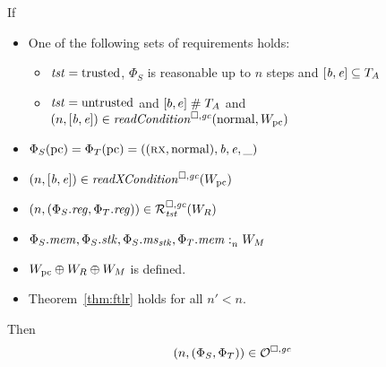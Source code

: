 \begin{lemma}
  \label{lem:ftlr-internal-lemma}
  If
  \begin{itemize}
  \item One of the following sets of requirements holds:
    \begin{itemize}
    \item $\mathit{tst} = \mathrm{trusted}$, $\Phi_S$ is reasonable up to $n$ steps and $[\mathit{b},\mathit{e}] \subseteq T_{A}$
    \item $\mathit{tst} = \mathrm{untrusted}$ and $[b,e] \mathrel{\#} T_{A}$ and $\npair{[\baddr,\eaddr]} \in \readCond{\normal,W_\pcreg}$
    \end{itemize}
  \item $\Phi_S(\mathrm{pc}) = \Phi_T(\mathrm{pc}) = ((\textsc{rx},\mathrm{normal}),\mathit{b},\mathit{e},\_)$
  \item $\npair{[\baddr,\eaddr]} \in \xReadCond{W_\pcreg}$
  \item $\npair{(\Phi_S.\reg,\Phi_T.\reg)} \in \lrrg{\trust}(W_R)$
  \item $\Phi_S.\mathit{mem},\Phi_S.\mathit{stk},\Phi_S.\mathit{ms}_{\mathit{stk}},\Phi_T.\mathit{mem} :_{n}^{}W_M$
  \item $W_{\mathrm{pc}} \oplus W_R \oplus W_M$ is defined.
  \item Theorem~\ref{thm:ftlr} holds for all $n' < n$.
  \end{itemize}
  Then
  \[
    \left(n,(\Phi_S,\Phi_T)\right) \in \mathcal{O}^{\square,\mathit{gc}}
  \]
\end{lemma}
